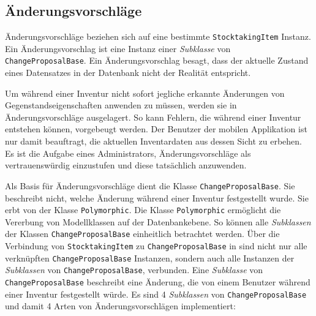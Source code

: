 \hypertarget{uxe4nderungsvorschluxe4ge}{%
\subsection{Änderungsvorschläge}\label{uxe4nderungsvorschluxe4ge}}

Änderungsvorschläge beziehen sich auf eine bestimmte
\texttt{StocktakingItem} Instanz. Ein Änderungsvorschlag ist eine
Instanz einer
\emph{Subklasse}
von \texttt{ChangeProposalBase}. Ein Änderungsvorschlag besagt, dass der
aktuelle Zustand eines Datensatzes in der Datenbank nicht der Realität
entspricht.

Um während einer Inventur nicht sofort jegliche erkannte Änderungen von
Gegenstandseigenschaften anwenden zu müssen, werden sie in
Änderungsvorschläge ausgelagert. So kann Fehlern, die während einer
Inventur entstehen können, vorgebeugt werden. Der Benutzer der mobilen
Applikation ist nur damit beauftragt, die aktuellen Inventardaten aus
dessen Sicht zu erbehen. Es ist die Aufgabe eines Administrators,
Änderungsvorschläge als vertrauenswürdig einzustufen und diese
tatsächlich anzuwenden.

Als Basis für Änderungsvorschläge dient die Klasse
\texttt{ChangeProposalBase}. Sie beschreibt nicht, welche Änderung
während einer Inventur festgestellt wurde. Sie erbt von der Klasse
\texttt{Polymorphic}. Die Klasse \texttt{Polymorphic} ermöglicht die
Vererbung von Modellklassen auf der Datenbankebene. So können alle
\emph{Subklassen}
der Klassen \texttt{ChangeProposalBase} einheitlich betrachtet werden.
Über die Verbindung von \texttt{StocktakingItem} zu
\texttt{ChangeProposalBase} in 
sind nicht nur alle verknüpften \texttt{ChangeProposalBase} Instanzen,
sondern auch alle Instanzen der
\emph{Subklassen}
von \texttt{ChangeProposalBase}, verbunden. Eine
\emph{Subklasse}
von \texttt{ChangeProposalBase} beschreibt eine Änderung, die von einem
Benutzer während einer Inventur festgestellt würde. Es sind 4
\emph{Subklassen}
von \texttt{ChangeProposalBase} und damit 4 Arten von
Änderungsvorschlägen implementiert:

